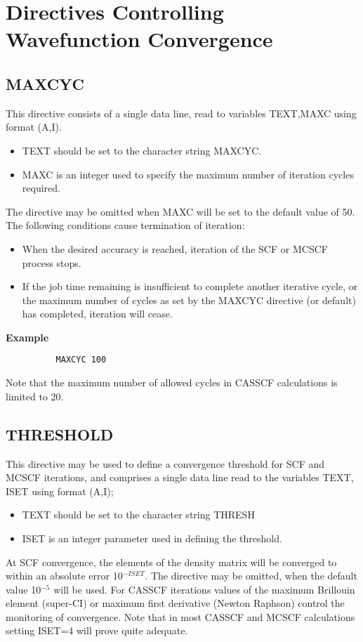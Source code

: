 \documentclass[11pt,fleqn]{article}
\begin{document}
\section[Directives Controlling Wavefunction Convergence]{Directives Controlling Wavefunction Convergence}


\subsection[MAXCYC]{MAXCYC}

This directive consists of a single data line, 
read to variables TEXT,MAXC using format (A,I).
\begin{itemize}
\item TEXT should be set to the character string MAXCYC.
\item MAXC is an integer used to specify the maximum number of
iteration cycles required.
\end{itemize}
The directive may be omitted when MAXC will be set to the default
value of 50.
The following conditions cause termination of iteration:
\begin{itemize}
\item When the desired accuracy is reached, iteration of the 
SCF or MCSCF process stops.

\item If the job time remaining is insufficient to complete another
iterative cycle, or the maximum number of cycles as set by the
MAXCYC directive (or default) has completed,  iteration will cease.
\end{itemize}

{\bf Example}
{
\footnotesize
\begin{verbatim}
          MAXCYC 100
\end{verbatim}
}

Note that the maximum number of allowed cycles in CASSCF calculations
is limited to 20.

\subsection[THRESHOLD]{THRESHOLD}

This directive may be used to define a convergence threshold for
SCF and MCSCF iterations, and comprises a single data line read
to the variables TEXT, ISET using format (A,I);
\begin{itemize}
\item TEXT should be set to the character string THRESH
\item ISET is an integer parameter used in defining the 
threshold.
\end{itemize}
At SCF convergence, the elements of the density matrix will be
converged to within an absolute error 10$^{-ISET}$. The directive
may be omitted, when the default value 10$^{-5}$ will be used.
For CASSCF iterations values of the maximum Brillouin element
(super-CI) or maximum first derivative (Newton Raphson) control
the monitoring of convergence. Note that in most CASSCF and MCSCF
calculations setting ISET=4 will prove quite adequate.
\end{document}
